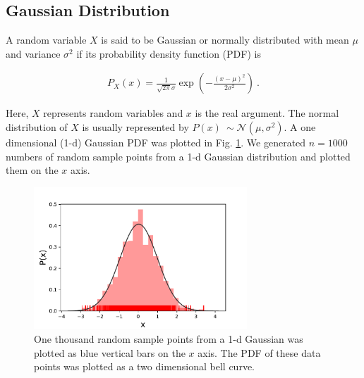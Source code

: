 \documentclass[12pt,letterpaper,fleqn,oneside,titlepage]{offroad-report}
\begin{document}
\subsection{Gaussian Distribution}

A random variable $X$ is said to be Gaussian or normally distributed with mean $\mu$ and variance $\sigma^2$ if its probability density function (PDF) is \cite{Murphy2012}
\begin{ceqn}
    \begin{align}
       P_X(x) = \frac{1}{\sqrt{2 \pi} \sigma}\exp{\left(-\frac{{\left(x - \mu \right)}^{2}}{2 \sigma^{2}}\right)} \ . \nonumber
    \end{align}
\end{ceqn}
Here, $X$ represents random variables and $x$ is the real argument. The normal distribution of $X$ is usually represented by $ P(x) ~ \sim\mathcal{N}(\mu, \sigma^2)$. A one dimensional (1-d) Gaussian PDF was plotted in Fig. \ref{FIG:2}. We generated $n=1000$ numbers of random sample points from a 1-d Gaussian distribution and plotted them on the $x$ axis.
\begin{figure}[h!]
	\centering
		\includegraphics[trim=0.4cm 0.1cm 1.4cm 0.6cm, width=8.0cm]{figs/1d_random.pdf}
    	\caption{One thousand random sample points from a 1-d Gaussian was plotted as blue vertical bars on the $x$ axis. The PDF of these data points was plotted as a two dimensional bell curve.}
    	\label{FIG:2}
\end{figure}
\end{document}
